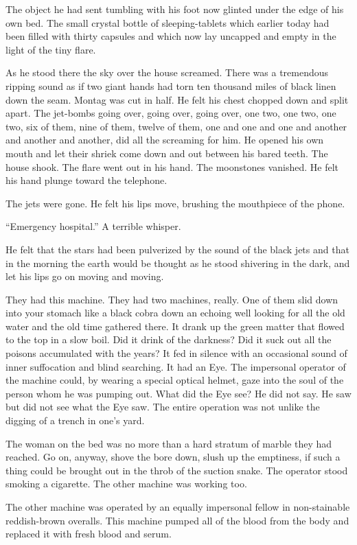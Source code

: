 \documentclass[11pt,openany]{book}
\begin{document}
The object he had sent tumbling with his foot now glinted under the edge of his own bed. The small crystal bottle of sleeping-tablets which earlier today had been filled with thirty capsules and which now lay uncapped and empty in the light of the tiny flare.

As he stood there the sky over the house screamed. There was a tremendous ripping sound as if two giant hands had torn ten thousand miles of black linen down the seam. Montag was cut in half. He felt his chest chopped down and split apart. The jet-bombs going over, going over, going over, one two, one two, one two, six of them, nine of them, twelve of them, one and one and one and another and another and another, did all the screaming for him. He opened his own mouth and let their shriek come down and out between his bared teeth. The house shook. The flare went out in his hand. The moonstones vanished. He felt his hand plunge toward the telephone.

The jets were gone. He felt his lips move, brushing the mouthpiece of the phone.

``Emergency hospital.'' A terrible whisper.

He felt that the stars had been pulverized by the sound of the black jets and that in the morning the earth would be thought as he stood shivering in the dark, and let his lips go on moving and moving.

They had this machine. They had two machines, really. One of them slid down into your stomach like a black cobra down an echoing well looking for all the old water and the old time gathered there. It drank up the green matter that flowed to the top in a slow boil. Did it drink of the darkness? Did it suck out all the poisons accumulated with the years? It fed in silence with an occasional sound of inner suffocation and blind searching. It had an Eye. The impersonal operator of the machine could, by wearing a special optical helmet, gaze into the soul of the person whom he was pumping out. What did the Eye see? He did not say. He saw but did not see what the Eye saw. The entire operation was not unlike the digging of a trench in one's yard.

The woman on the bed was no more than a hard stratum of marble they had reached. Go on, anyway, shove the bore down, slush up the emptiness, if such a thing could be brought out in the throb of the suction snake. The operator stood smoking a cigarette. The other machine was working too.

The other machine was operated by an equally impersonal fellow in non-stainable reddish-brown overalls. This machine pumped all of the blood from the body and replaced it with fresh blood and serum.
\end{document}

